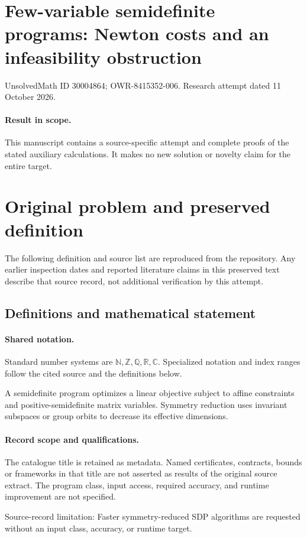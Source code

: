 \documentclass[11pt]{article}
\begin{document}
\section*{Few-variable semidefinite programs: Newton costs and an infeasibility obstruction}
\noindent UnsolvedMath ID 30004864; OWR-8415352-006. Research attempt dated 11 October 2026.
\paragraph{Result in scope.}This manuscript contains a source-specific attempt and complete proofs of the stated auxiliary calculations. It makes no new solution or novelty claim for the entire target.
\section{Original problem and preserved definition}
The following definition and source list are reproduced from the repository. Any earlier inspection dates and reported literature claims in this preserved text describe that source record, not additional verification by this attempt.
\subsection{Definitions and mathematical statement}

\paragraph{Shared notation.}Standard number systems are $\mathbb N,\mathbb Z,\mathbb Q,\mathbb R,\mathbb C$. Specialized notation and index ranges follow the cited source and the definitions below.


A semidefinite program optimizes a linear objective subject to affine constraints and positive-semidefinite matrix variables. Symmetry reduction uses invariant subspaces or group orbits to decrease its effective dimensions.
\paragraph{Record scope and qualifications.}
The catalogue title is retained as metadata. Named certificates, contracts, bounds or frameworks in that title are not asserted as results of the original source extract.
The program class, input access, required accuracy, and runtime improvement are not specified.

Source-record limitation: Faster symmetry-reduced SDP algorithms are requested without an input class, accuracy, or runtime target.
\end{document}
